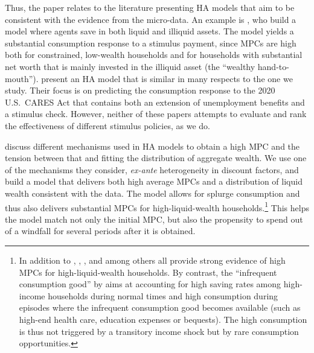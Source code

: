 \documentclass[\econtexRoot/HAFiscal]{subfiles}
\begin{document}
Thus, the paper relates to the literature presenting HA models that aim to be consistent with the evidence from the micro-data. An example is \cite{kaplan2014model}, who build a model where agents save in both liquid and illiquid assets. The model yields a substantial consumption response to a stimulus payment, since MPCs are high both for constrained, low-wealth households and for households with substantial net worth that is mainly invested in the illiquid asset (the ``wealthy hand-to-mouth''). \cite{carroll2020modeling} present an HA model that is similar in many respects to the one we study. Their focus is on predicting the consumption response to the 2020 U.S.\ CARES Act that contains both an extension of unemployment benefits and a stimulus check. However, neither of these papers attempts to evaluate and rank the effectiveness of different stimulus policies, as we do.

\cite{kaplanMPC2022} discuss different mechanisms used in HA models to obtain a high MPC and the tension between that and fitting the distribution of aggregate wealth. We use one of the mechanisms they consider, \textit{ex-ante} heterogeneity in discount factors, and build a model that delivers both high average MPCs and a distribution of liquid wealth consistent with the data. The model allows for splurge consumption and thus also delivers substantial MPCs for high-liquid-wealth households.\footnote{In addition to \cite{fagereng_mpc_2021}, \cite{graham2024mental}, \cite{crawley2023MicroMacro}, and \cite{kueng2018excess} among others all provide strong evidence of high MPCs for high-liquid-wealth households. By contrast, the ``infrequent consumption good'' by \citet{melcangi2024stock} aims at accounting for high saving rates among high-income households during normal times and high consumption during episodes where the infrequent consumption good becomes available (such as high-end health care, education expenses or bequests). The high consumption is thus not triggered by a transitory income shock but by rare consumption opportunities.} This helps the model match not only the initial MPC, but also the propensity to spend out of a windfall for several periods after it is obtained.
\end{document}
